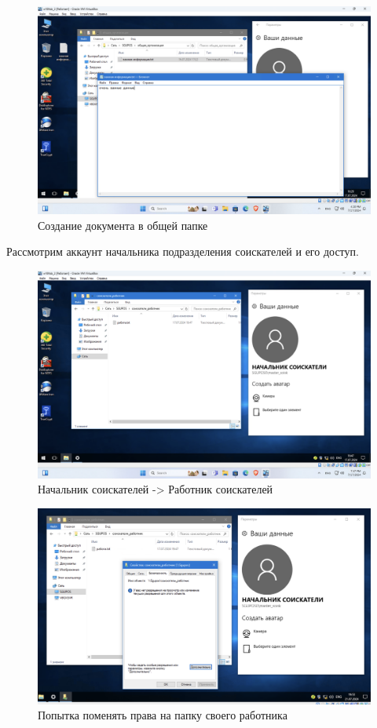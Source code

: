 \begin{figure}[H]
  \centering
  \includegraphics[width=1\textwidth]{pict/prac/34}
  \caption{Создание документа в общей папке}
  \label{fig:33}
\end{figure}

Рассмотрим аккаунт начальника подразделения соискателей и его доступ.
\begin{figure}[H]
  \centering
  \includegraphics[width=1\textwidth]{pict/prac/35}
  \caption{Начальник соискателей -> Работник соискателей}
\end{figure}

\begin{figure}[H]
  \centering
  \includegraphics[width=1\textwidth]{pict/prac/69}
  \caption{Попытка поменять права на папку своего работника}
\end{figure}

